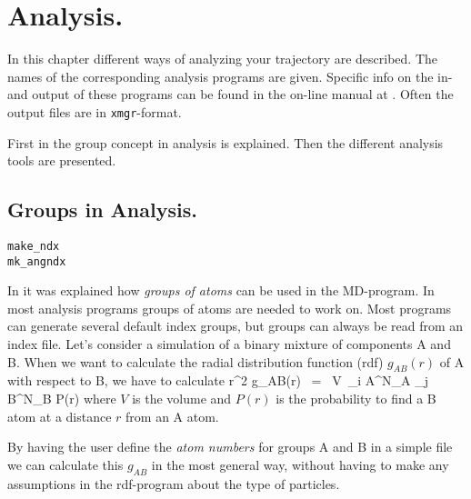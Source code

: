%
% 
% 
% 
% 
% 
% 
% 
% 
%

\chapter{Analysis.}
\label{ch:analysis}
In this chapter different ways of analyzing your trajectory are described. 
The names of the corresponding analysis programs are given. 
Specific info on the in- and output of these programs can be found 
in the on-line manual at {\wwwpage}.
Often the output files are in {\tt xmgr}-format.

First in  the group concept in analysis is explained. 
Then the different analysis tools are presented.


\section{Groups in Analysis.}
\label{sec:groups}
\begin{verbatim}
make_ndx
mk_angndx
\end{verbatim}
In  it was explained how {\em groups of
atoms} can be used in the MD-program.  In most analysis programs groups
of atoms are needed to work on. Most programs can generate several default
index groups, but groups can always be read from an index file. Let's
consider a simulation of a binary mixture of components A and B. When
we want to calculate the radial distribution function (rdf)
$g_{AB}(r)$ of A with respect to B, we have to calculate
\pi r^2 g_{AB}(r)	~=~	V~\sum_{i \in A}^{N_A} \sum_{j \in B}^{N_B} P(r)
\eeq
where $V$ is the volume and $P(r)$ is the probability to find a B atom
at a distance $r$ from an A atom.

By having the user define the {\em atom numbers} for groups A and B in
a simple file we can calculate this $g_{AB}$ in the most general way, without
having to make any assumptions in the rdf-program about the type of 
particles. 

